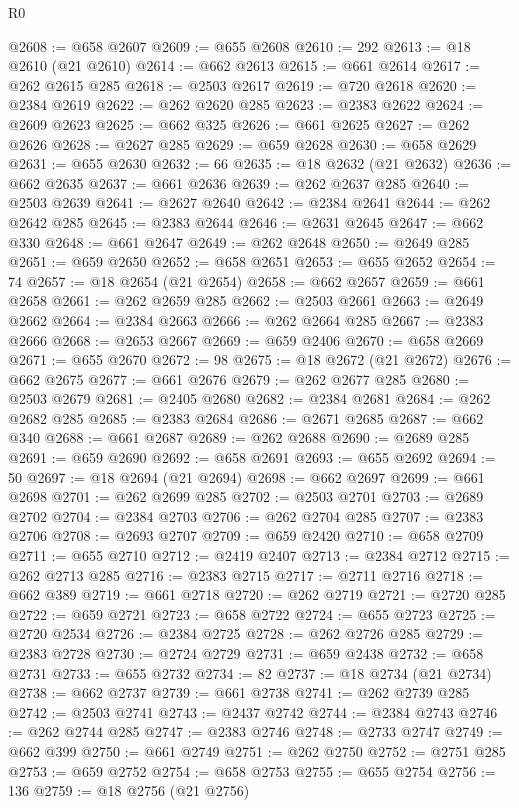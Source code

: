 \begin{lexlean}{R0}
\begin{coremodule}
@2608 := @658 @2607
@2609 := @655 @2608
@2610 := 292
@2613 := @18 @2610 (@21 @2610)
@2614 := @662 @2613
@2615 := @661 @2614
@2617 := @262 @2615 @285
@2618 := @2503 @2617
@2619 := @720 @2618
@2620 := @2384 @2619
@2622 := @262 @2620 @285
@2623 := @2383 @2622
@2624 := @2609 @2623
@2625 := @662 @325
@2626 := @661 @2625
@2627 := @262 @2626
@2628 := @2627 @285
@2629 := @659 @2628
@2630 := @658 @2629
@2631 := @655 @2630
@2632 := 66
@2635 := @18 @2632 (@21 @2632)
@2636 := @662 @2635
@2637 := @661 @2636
@2639 := @262 @2637 @285
@2640 := @2503 @2639
@2641 := @2627 @2640
@2642 := @2384 @2641
@2644 := @262 @2642 @285
@2645 := @2383 @2644
@2646 := @2631 @2645
@2647 := @662 @330
@2648 := @661 @2647
@2649 := @262 @2648
@2650 := @2649 @285
@2651 := @659 @2650
@2652 := @658 @2651
@2653 := @655 @2652
@2654 := 74
@2657 := @18 @2654 (@21 @2654)
@2658 := @662 @2657
@2659 := @661 @2658
@2661 := @262 @2659 @285
@2662 := @2503 @2661
@2663 := @2649 @2662
@2664 := @2384 @2663
@2666 := @262 @2664 @285
@2667 := @2383 @2666
@2668 := @2653 @2667
@2669 := @659 @2406
@2670 := @658 @2669
@2671 := @655 @2670
@2672 := 98
@2675 := @18 @2672 (@21 @2672)
@2676 := @662 @2675
@2677 := @661 @2676
@2679 := @262 @2677 @285
@2680 := @2503 @2679
@2681 := @2405 @2680
@2682 := @2384 @2681
@2684 := @262 @2682 @285
@2685 := @2383 @2684
@2686 := @2671 @2685
@2687 := @662 @340
@2688 := @661 @2687
@2689 := @262 @2688
@2690 := @2689 @285
@2691 := @659 @2690
@2692 := @658 @2691
@2693 := @655 @2692
@2694 := 50
@2697 := @18 @2694 (@21 @2694)
@2698 := @662 @2697
@2699 := @661 @2698
@2701 := @262 @2699 @285
@2702 := @2503 @2701
@2703 := @2689 @2702
@2704 := @2384 @2703
@2706 := @262 @2704 @285
@2707 := @2383 @2706
@2708 := @2693 @2707
@2709 := @659 @2420
@2710 := @658 @2709
@2711 := @655 @2710
@2712 := @2419 @2407
@2713 := @2384 @2712
@2715 := @262 @2713 @285
@2716 := @2383 @2715
@2717 := @2711 @2716
@2718 := @662 @389
@2719 := @661 @2718
@2720 := @262 @2719
@2721 := @2720 @285
@2722 := @659 @2721
@2723 := @658 @2722
@2724 := @655 @2723
@2725 := @2720 @2534
@2726 := @2384 @2725
@2728 := @262 @2726 @285
@2729 := @2383 @2728
@2730 := @2724 @2729
@2731 := @659 @2438
@2732 := @658 @2731
@2733 := @655 @2732
@2734 := 82
@2737 := @18 @2734 (@21 @2734)
@2738 := @662 @2737
@2739 := @661 @2738
@2741 := @262 @2739 @285
@2742 := @2503 @2741
@2743 := @2437 @2742
@2744 := @2384 @2743
@2746 := @262 @2744 @285
@2747 := @2383 @2746
@2748 := @2733 @2747
@2749 := @662 @399
@2750 := @661 @2749
@2751 := @262 @2750
@2752 := @2751 @285
@2753 := @659 @2752
@2754 := @658 @2753
@2755 := @655 @2754
@2756 := 136
@2759 := @18 @2756 (@21 @2756)

\end{coremodule}
\end{lexlean}
